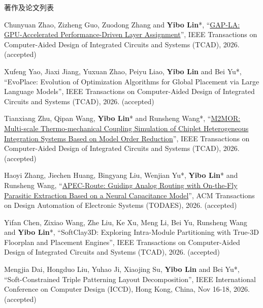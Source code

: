 \begin{rSection}{著作及论文列表}
\begin{description}[font=\normalfont, rightmargin=2em]
\item[{[J250]}]{
        Chunyuan Zhao, Zizheng Guo, Zuodong Zhang and \textbf{Yibo Lin}*, 
    ``\href{https://doi.org/10.1109/TCAD.2025.3650401}{GAP-LA: GPU-Accelerated Performance-Driven Layer Assignment}'', 
    IEEE Transactions on Computer-Aided Design of Integrated Circuits and Systems (TCAD), 2026.
    (accepted)
}
            

\item[{[J249]}]{
        Xufeng Yao, Jiaxi Jiang, Yuxuan Zhao, Peiyu Liao, \textbf{Yibo Lin} and Bei Yu*, 
    ``EvoPlace: Evolution of Optimization Algorithms for Global Placement via Large Language Models'', 
    IEEE Transactions on Computer-Aided Design of Integrated Circuits and Systems (TCAD), 2026.
    (accepted)
}
            

\item[{[J248]}]{
        Tianxiang Zhu, Qipan Wang, \textbf{Yibo Lin}* and Runsheng Wang*, 
    ``\href{https://doi.org/10.1109/TCAD.2026.3728619}{M2MOR: Multi-scale Thermo-mechanical Coupling Simulation of Chiplet Heterogeneous Integration Systems Based on Model Order Reduction}'', 
    IEEE Transactions on Computer-Aided Design of Integrated Circuits and Systems (TCAD), 2026.
    (accepted)
}
            

\item[{[J247]}]{
        Haoyi Zhang, Jiechen Huang, Bingyang Liu, Wenjian Yu*, \textbf{Yibo Lin}* and Runsheng Wang, 
    ``\href{https://doi.org/10.1145/3848639}{APEC-Route: Guiding Analog Routing with On-the-Fly Parasitic Extraction Based on a Neural Capacitance Model}'', 
    ACM Transactions on Design Automation of Electronic Systems (TODAES), 2026.
    (accepted)
}
            

\item[{[J246]}]{
        Yifan Chen, Zixiao Wang, Zhe Liu, Ke Xu, Meng Li, Bei Yu, Runsheng Wang and \textbf{Yibo Lin}*, 
    ``{SoftClay3D}: Exploring Intra-Module Partitioning with True-3D Floorplan and Placement Engines'', 
    IEEE Transactions on Computer-Aided Design of Integrated Circuits and Systems (TCAD), 2026.
    (accepted)
}
            

\item[{[C245]}]{
        Mengjia Dai, Hongduo Liu, Yuhao Ji, Xiaojing Su, \textbf{Yibo Lin} and Bei Yu*, 
    ``Soft-Constrained Triple Patterning Layout Decomposition'', 
    IEEE International Conference on Computer Design (ICCD), Hong Kong, China, Nov 16-18, 2026.
    (accepted)
}
            


\end{description}
\end{rSection}
